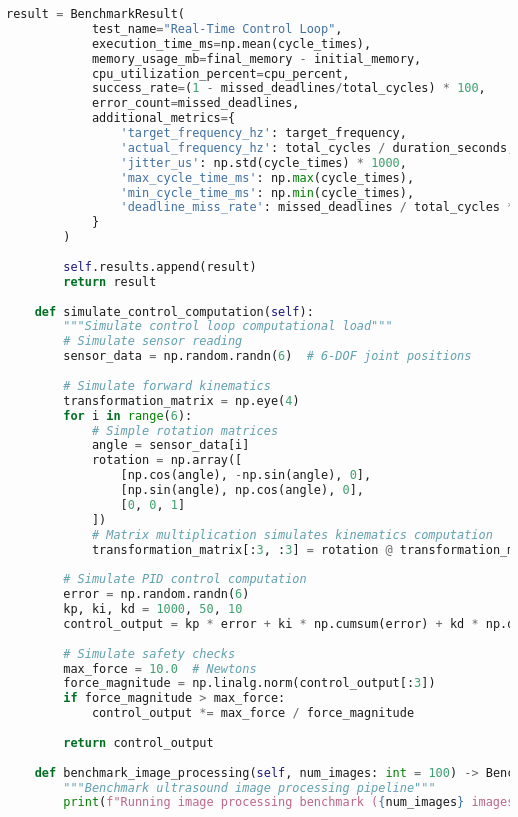 \begin{lstlisting}[language=Python, caption={Performance Benchmark Script}, label={lst:app-benchmark-script}]
        result = BenchmarkResult(
            test_name="Real-Time Control Loop",
            execution_time_ms=np.mean(cycle_times),
            memory_usage_mb=final_memory - initial_memory,
            cpu_utilization_percent=cpu_percent,
            success_rate=(1 - missed_deadlines/total_cycles) * 100,
            error_count=missed_deadlines,
            additional_metrics={
                'target_frequency_hz': target_frequency,
                'actual_frequency_hz': total_cycles / duration_seconds,
                'jitter_us': np.std(cycle_times) * 1000,
                'max_cycle_time_ms': np.max(cycle_times),
                'min_cycle_time_ms': np.min(cycle_times),
                'deadline_miss_rate': missed_deadlines / total_cycles * 100
            }
        )
        
        self.results.append(result)
        return result
    
    def simulate_control_computation(self):
        """Simulate control loop computational load"""
        # Simulate sensor reading
        sensor_data = np.random.randn(6)  # 6-DOF joint positions
        
        # Simulate forward kinematics
        transformation_matrix = np.eye(4)
        for i in range(6):
            # Simple rotation matrices
            angle = sensor_data[i]
            rotation = np.array([
                [np.cos(angle), -np.sin(angle), 0],
                [np.sin(angle), np.cos(angle), 0],
                [0, 0, 1]
            ])
            # Matrix multiplication simulates kinematics computation
            transformation_matrix[:3, :3] = rotation @ transformation_matrix[:3, :3]
        
        # Simulate PID control computation
        error = np.random.randn(6)
        kp, ki, kd = 1000, 50, 10
        control_output = kp * error + ki * np.cumsum(error) + kd * np.diff(error, prepend=0)
        
        # Simulate safety checks
        max_force = 10.0  # Newtons
        force_magnitude = np.linalg.norm(control_output[:3])
        if force_magnitude > max_force:
            control_output *= max_force / force_magnitude
        
        return control_output
    
    def benchmark_image_processing(self, num_images: int = 100) -> BenchmarkResult:
        """Benchmark ultrasound image processing pipeline"""
        print(f"Running image processing benchmark ({num_images} images)...")
        

\end{lstlisting}
